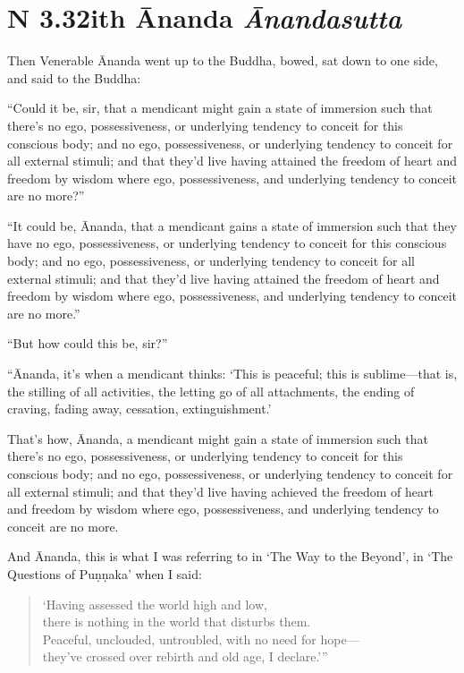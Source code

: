 \documentclass[12pt,openany]{book}%
\newcommand*{\suttatitleacronym}[1]{\smaller[2]{#1}\vspace*{.3em}}
\newcommand*{\suttatitletranslation}[1]{\linebreak{#1}}
\newcommand*{\suttatitleroot}[1]{\linebreak\smaller[2]\itshape{#1}}
\newcommand*{\tocacronym}[1]{\hspace*{-3.3em}{#1}\quad}
\newcommand*{\toctranslation}[1]{#1}
\newcommand*{\tocroot}[1]{(\textit{#1})}
\begin{document}
%
\section*{{\suttatitleacronym AN 3.32}{\suttatitletranslation With Ānanda }{\suttatitleroot Ānandasutta}}
\addcontentsline{toc}{section}{\tocacronym{AN 3.32} \toctranslation{With Ānanda } \tocroot{Ānandasutta}}

Then Venerable Ānanda went up to the Buddha, bowed, sat down to one side, and said to the Buddha: 

“Could it be, sir, that a mendicant might gain a state of immersion such that there’s no ego, possessiveness, or underlying tendency to conceit for this conscious body; and no ego, possessiveness, or underlying tendency to conceit for all external stimuli; and that they’d live having attained the freedom of heart and freedom by wisdom where ego, possessiveness, and underlying tendency to conceit are no more?” 

“It could be, Ānanda, that a mendicant gains a state of immersion such that they have no ego, possessiveness, or underlying tendency to conceit for this conscious body; and no ego, possessiveness, or underlying tendency to conceit for all external stimuli; and that they’d live having attained the freedom of heart and freedom by wisdom where ego, possessiveness, and underlying tendency to conceit are no more.” 

“But how could this be, sir?” 

“Ānanda, it’s when a mendicant thinks: ‘This is peaceful; this is sublime—that is, the stilling of all activities, the letting go of all attachments, the ending of craving, fading away, cessation, extinguishment.’ 

That’s how, Ānanda, a mendicant might gain a state of immersion such that there’s no ego, possessiveness, or underlying tendency to conceit for this conscious body; and no ego, possessiveness, or underlying tendency to conceit for all external stimuli; and that they’d live having achieved the freedom of heart and freedom by wisdom where ego, possessiveness, and underlying tendency to conceit are no more. 

And Ānanda, this is what I was referring to in ‘The Way to the Beyond’, in ‘The Questions of \textsanskrit{Puṇṇaka}’ when I said: 

\begin{verse}%
‘Having assessed the world high and low, \\
there is nothing in the world that disturbs them. \\
Peaceful, unclouded, untroubled, with no need for hope—\\
they’ve crossed over rebirth and old age, I declare.’” 

%
\end{verse}
\end{document}
